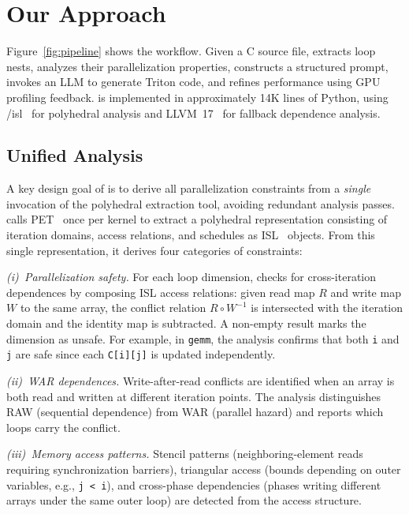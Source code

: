 \section{Our Approach}
\label{sec:method}


Figure~\ref{fig:pipeline} shows the \sysname workflow.
Given a C source file, \sysname extracts loop nests, analyzes their parallelization properties, constructs a structured prompt, invokes an LLM to generate Triton code, and refines performance using GPU profiling feedback.
\sysname is implemented in approximately 14K lines of Python, using \pet/isl~\cite{verdoolaege2010isl} for polyhedral analysis and LLVM~17~\cite{llvm} for fallback dependence analysis.

\subsection{Unified Analysis}
A key design goal of \sysname is to derive all parallelization constraints from a \emph{single} invocation of the polyhedral extraction tool, avoiding redundant analysis passes.
\sysname calls PET~\cite{verdoolaege2012polyhedral} once per kernel to extract a polyhedral representation consisting of iteration domains, access relations, and schedules as ISL~\cite{verdoolaege2010isl} objects. From this single representation, it derives four categories of constraints:

\emph{(i)~Parallelization safety.}
For each loop dimension, \sysname checks for cross-iteration dependences by composing ISL access relations: given read map $R$ and write map $W$ to the same array, the conflict relation $R \circ W^{-1}$ is intersected with the iteration domain and the identity map is subtracted. A non-empty result marks the dimension as unsafe.
For example, in \texttt{gemm}, the analysis confirms that both \texttt{i} and \texttt{j} are safe since each \texttt{C[i][j]} is updated independently.

\emph{(ii)~WAR dependences.}
Write-after-read conflicts are identified when an array is both read and written at different iteration points. The analysis distinguishes RAW (sequential dependence) from WAR (parallel hazard) and reports which loops carry the conflict.

\emph{(iii)~Memory access patterns.}
Stencil patterns (neighboring-element reads requiring synchronization barriers), triangular access (bounds depending on outer variables, e.g., \texttt{j < i}), and cross-phase dependencies (phases writing different arrays under the same outer loop) are detected from the access structure.

